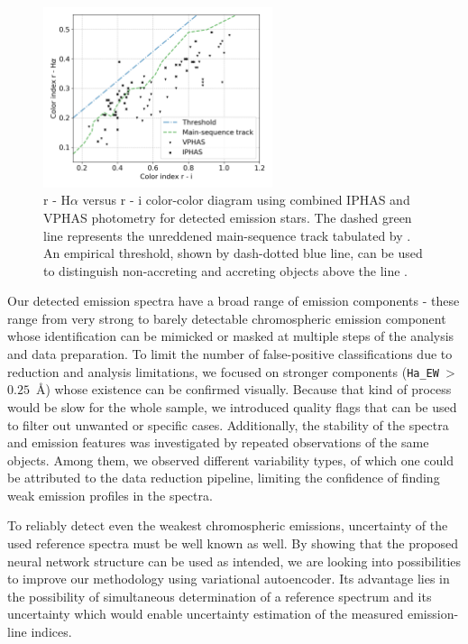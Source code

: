 \begin{figure}
	\centering
	\includegraphics[width=0.6\textwidth]{mag_iphas_vphas_sep.png}
	\caption{r - H$\alpha$ versus r - i color-color diagram using combined IPHAS and VPHAS photometry for detected emission stars. The dashed green line represents the unreddened main-sequence track tabulated by \citet{2014MNRAS.440.2036D}. An empirical threshold, shown by dash-dotted blue line, can be used to distinguish non-accreting and accreting objects above the line \citep{2018A&A...609A..10V}.}
	\label{fig:iphas_vphas}
\end{figure}

Our detected emission spectra have a broad range of emission components - these range from very strong to barely detectable chromospheric emission component whose identification can be mimicked or masked at multiple steps of the analysis and data preparation. To limit the number of false-positive classifications due to reduction and analysis limitations, we focused on stronger components (\texttt{Ha\_EW}~>~$0.25$~\AA) whose existence can be confirmed visually. Because that kind of process would be slow for the whole sample, we introduced quality flags that can be used to filter out unwanted or specific cases. Additionally, the stability of the spectra and emission features was investigated by repeated observations of the same objects. Among them, we observed different variability types, of which one could be attributed to the data reduction pipeline, limiting the confidence of finding weak emission profiles in the spectra.

To reliably detect even the weakest chromospheric emissions, uncertainty of the used reference spectra must be well known as well. By showing that the proposed neural network structure can be used as intended, we are looking into possibilities to improve our methodology using variational autoencoder. Its advantage lies in the possibility of simultaneous determination of a reference spectrum and its uncertainty which would enable uncertainty estimation of the measured emission-line indices.
